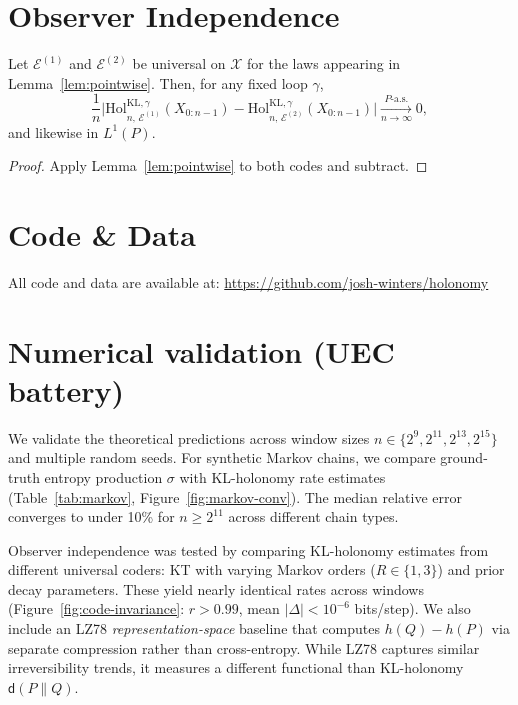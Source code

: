 \documentclass[11pt]{article}
\newcommand{\X}{\mathcal{X}}
\newcommand{\1}{\mathbbm{1}}
\newcommand{\code}{\mathcal{E}}
\begin{document}
\section{Observer Independence}

\begin{theorem}\label{thm:observer_ind}
Let $\code^{(1)}$ and $\code^{(2)}$ be universal on $\X$ for the laws appearing in Lemma~\ref{lem:pointwise}. Then, for any fixed loop $\gamma$,
\[
\frac{1}{n}\Big|\mathrm{Hol}_{n,\,\code^{(1)}}^{\mathrm{KL},\gamma}(X_{0:n-1}) - \mathrm{Hol}_{n,\,\code^{(2)}}^{\mathrm{KL},\gamma}(X_{0:n-1})\Big| \xrightarrow[n\to\infty]{P\text{-a.s.}} 0,
\]
and likewise in $L^1(P)$.
\end{theorem}
\begin{proof}
Apply Lemma~\ref{lem:pointwise} to both codes and subtract.
\end{proof}

\section{Code \& Data}

All code and data are available at: \url{https://github.com/josh-winters/holonomy}

\section{Numerical validation (UEC battery)}

We validate the theoretical predictions across window sizes $n \in \{2^9, 2^{11}, 2^{13}, 2^{15}\}$ and multiple random seeds. For synthetic Markov chains, we compare ground-truth entropy production $\sigma$ with KL-holonomy rate estimates (Table~\ref{tab:markov}, Figure~\ref{fig:markov-conv}). The median relative error converges to under 10\% for $n \geq 2^{11}$ across different chain types.

Observer independence was tested by comparing KL-holonomy estimates from
different universal coders: KT with varying Markov orders ($R \in \{1,3\}$) and 
prior decay parameters. These yield nearly identical rates across windows 
(Figure~\ref{fig:code-invariance}: $r > 0.99$, mean $|\Delta| < 10^{-6}$ bits/step).
We also include an LZ78 \emph{representation-space} baseline that computes 
$h(Q)-h(P)$ via separate compression rather than cross-entropy. While LZ78 
captures similar irreversibility trends, it measures a different functional 
than KL-holonomy $\mathsf{d}(P\|Q)$.
\end{document}
